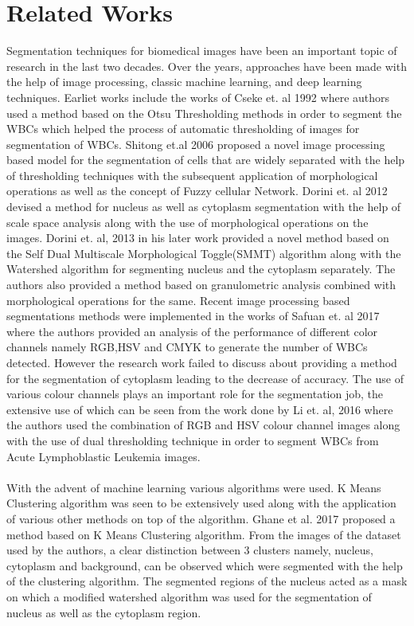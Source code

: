 \documentclass[conference]{IEEEtran}
\begin{document}
\section{Related Works}
Segmentation techniques for biomedical images have been an important topic of research in the last two decades. Over the years,  approaches have been made with the help of image processing, classic machine learning, and deep learning techniques. 
Earliet works include the works of Cseke et. al 1992 \cite{10}
where authors used a method based on the Otsu Thresholding methods in order to segment the WBCs which helped the process of automatic thresholding of images for segmentation of WBCs.
Shitong et.al 2006 \cite{6} proposed a novel image processing based model for the segmentation of cells that are widely separated with the help of thresholding techniques with the subsequent application of morphological operations as well as the concept of Fuzzy cellular Network. Dorini et. al 2012 \cite{8} devised a method for nucleus as well as cytoplasm segmentation with the help of scale space analysis along with the use of morphological operations on the images. Dorini et. al, 2013 \cite{8} in his later work provided a novel method based on the Self Dual Multiscale Morphological Toggle(SMMT) algorithm along with the Watershed algorithm for segmenting nucleus and the cytoplasm separately. The authors also provided a method based on granulometric analysis combined with morphological operations for the same. 
Recent image processing based segmentations methods were implemented in the works of Safuan et. al 2017 \cite{9} where the authors provided an analysis of the performance of different color channels namely RGB,HSV and CMYK to generate the number of WBCs detected. However the research work failed to discuss about providing a method for the segmentation of cytoplasm leading to the decrease of accuracy. 
The use of various colour channels plays an important role for the segmentation job, the extensive use of which can be seen from the work done by Li et. al, 2016 \cite{11} where the authors used the combination of RGB and HSV colour channel images along with the use of dual thresholding technique in order to segment WBCs from Acute Lymphoblastic Leukemia images. \\
\\
With the advent of machine learning various algorithms were used. K Means Clustering algorithm was seen to be extensively used along with the application of various other methods on top of the algorithm. Ghane et al. 2017 \cite{13} proposed a method based on K Means Clustering algorithm. From the images of the dataset used by the authors, a clear distinction between 3 clusters namely, nucleus, cytoplasm and background, can be observed which were segmented with the help of the clustering algorithm. The segmented regions of the nucleus acted as a mask on which a modified watershed algorithm was used for the segmentation of nucleus as well as the cytoplasm region. 
\end{document}
